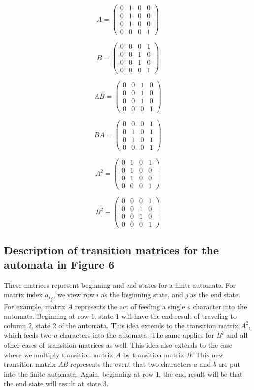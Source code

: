 \documentclass[12pt]{scrreprt}
\begin{document}
\[ A = \left( \begin{array}{cccc}
0 & 1 & 0 & 0 \\
0 & 1 & 0 & 0 \\
0 & 1 & 0 & 0 \\
0 & 0 & 0 & 1 \end{array} \right)\] 

\[ B = \left( \begin{array}{cccc}
0 & 0 & 0 & 1 \\
0 & 0 & 1 & 0 \\
0 & 0 & 1 & 0 \\
0 & 0 & 0 & 1 \end{array} \right)\] 

\[ AB = \left( \begin{array}{cccc}
0 & 0 & 1 & 0 \\
0 & 0 & 1 & 0 \\
0 & 0 & 1 & 0 \\
0 & 0 & 0 & 1 \end{array} \right)\] 

\[ BA = \left( \begin{array}{cccc}
0 & 0 & 0 & 1 \\
0 & 1 & 0 & 1 \\
0 & 1 & 0 & 1 \\
0 & 0 & 0 & 1 \end{array} \right)\] 

\[ A^2 = \left( \begin{array}{ccccc}
0 & 1 & 0 & 1 \\
0 & 1 & 0 & 0 \\
0 & 1 & 0 & 0 \\
0 & 0 & 0 & 1 \end{array} \right)\] 

\[ B^2 = \left( \begin{array}{ccccc}
0 & 0 & 0 & 1 \\
0 & 0 & 1 & 0 \\
0 & 0 & 1 & 0 \\
0 & 0 & 0 & 1 \end{array} \right)\] 

\subsection{Description of transition matrices for the automata in Figure 6}
These matrices represent beginning and end states for a finite automata. For matrix index ${a_i}_j$, we view row
$i$ as the beginning state, and $j$ as the end state. For example, matrix $A$ represents the act of feeding a 
single $a$ character into the automata. Beginning at row $1$, state $1$ will have the end result of traveling  
to column $2$, state $2$ of the automata. This idea extends to the transition matrix $A^2$, which feeds two $a$ 
characters into the automata. The same applies for $B^2$ and all other cases of transition matrices as well. 
This idea also extends to the case where we multiply transition matrix $A$ by transition matrix $B$. 
This new transition matrix $AB$ represents the event that two characters $a$ and $b$ are put into the 
finite automata. Again, beginning at row $1$, the end result will be that the end state will result at state $3$.
\end{document}
